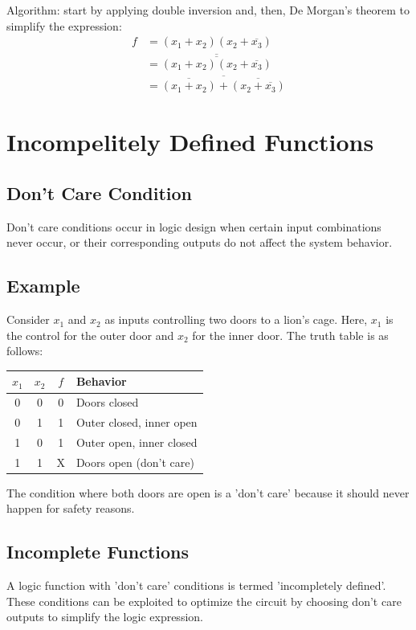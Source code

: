 \documentclass[12pt,openany, tikz,border=10pt]{book}
\begin{document}
Algorithm: start by applying double inversion and, then, De Morgan's theorem to simplify the expression:
\begin{align}
f &= (x_1 + x_2)(x_2 + \overline{x_3}) \\
&= \overline{\overline{(x_1 + x_2)(x_2 + \overline{x_3})}} \\
&= \overline{\overline{(x_1 + x_2)} + \overline{(x_2 + \overline{x_3})}}
\end{align}
\section{Incompelitely Defined Functions}
\subsection{Don't Care Condition}
Don't care conditions occur in logic design when certain input combinations never occur, or their corresponding outputs do not affect the system behavior. 

\subsection{Example}
Consider \( x_1 \) and \( x_2 \) as inputs controlling two doors to a lion's cage. Here, \( x_1 \) is the control for the outer door and \( x_2 \) for the inner door. The truth table is as follows:

\begin{center}
    \begin{tabular}{cc|c|l}
    \( x_1 \) & \( x_2 \) & \( f \) & Behavior \\
    \hline
    0 & 0 & 0 & Doors closed \\
    0 & 1 & 1 & Outer closed, inner open \\
    1 & 0 & 1 & Outer open, inner closed \\
    1 & 1 & X & Doors open (don't care) \\
    \end{tabular}
\end{center}

The condition where both doors are open is a 'don't care' because it should never happen for safety reasons.

\subsection{Incomplete Functions}
A logic function with 'don't care' conditions is termed 'incompletely defined'. These conditions can be exploited to optimize the circuit by choosing don't care outputs to simplify the logic expression.
\end{document}
